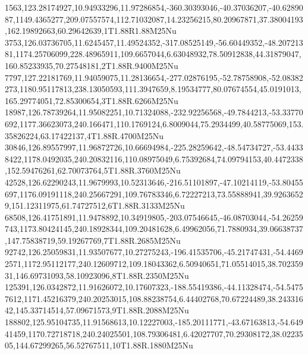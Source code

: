 1563,123.28174927,10.94933296,11.97286854,-360.30393046,-40.37036207,-40.6289087,1149.4365277,209.07557574,112.71032087,14.23256215,80.20967871,37.38004193,162.19892663,60.29642639,1T1.88R1.88M25Nu
3753,126.03736705,11.6245457,11.49524352,-317.08525149,-56.60449352,-48.20721381,1174.25706099,228.48965911,109.6657044,6.63048932,78.50912838,44.31879047,160.85233935,70.27548181,2T1.88R.9400M25Nu
7797,127.22181769,11.94059075,11.28136654,-277.02876195,-52.78758908,-52.08382273,1180.95117813,238.13050593,111.3947659,8.19534777,80.07674554,45.0191013,165.29774051,72.85300654,3T1.88R.6266M25Nu
18987,126.78739264,11.95082251,10.71324088,-232.92256568,-49.7844213,-53.33770692,1177.36623073,240.166471,110.1769124,6.8009044,75.2934499,40.58775069,153.35826224,63.17422137,4T1.88R.4700M25Nu
30846,126.89557997,11.96872726,10.66694984,-225.28259642,-48.54734727,-53.44338422,1178.0492035,240.20832116,110.08975049,6.75392684,74.09794153,40.4472338,152.59476261,62.70073764,5T1.88R.3760M25Nu
42528,126.62290243,11.9679993,10.52313646,-216.51101897,-47.10214119,-53.80455697,1176.09191118,240.25667291,109.76783346,6.72227213,73.55888941,39.92636529,151.12311975,61.74727512,6T1.88R.3133M25Nu
68508,126.41751891,11.9478892,10.34919805,-203.07546645,-46.08703044,-54.26259743,1173.80424145,240.18928344,109.20481628,6.49962056,71.7880934,39.06638737,147.75838719,59.19267769,7T1.88R.2685M25Nu
92742,126.25059831,11.93507677,10.27275243,-196.41535706,-45.21747431,-54.44692571,1172.95112177,240.12609712,109.18043362,6.50940651,71.05514015,38.70235931,146.69731093,58.10923096,8T1.88R.2350M25Nu
125391,126.0342872,11.91626072,10.17607323,-188.55419386,-44.11328474,-54.54757612,1171.45216379,240.20253015,108.88238754,6.44402768,70.67224489,38.24331642,145.33714514,57.09671573,9T1.88R.2088M25Nu
188802,125.95104735,11.91568613,10.12227003,-185.20111771,-43.67163813,-54.64941459,1170.72718718,240.24025501,108.79306481,6.42027707,70.29308172,38.0223505,144.67299265,56.52767511,10T1.88R.1880M25Nu
